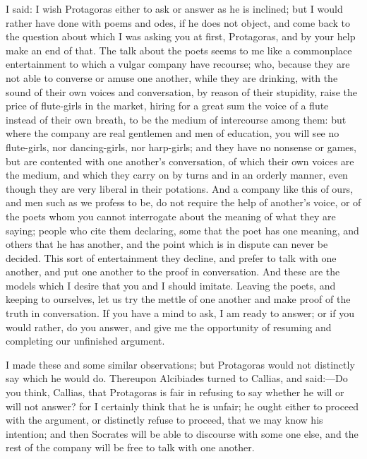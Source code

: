 \documentclass[11pt,letter]{article}
\begin{document}
\par  I said: I wish Protagoras either to ask or answer as he is inclined; but I would rather have done with poems and odes, if he does not object, and come back to the question about which I was asking you at first, Protagoras, and by your help make an end of that. The talk about the poets seems to me like a commonplace entertainment to which a vulgar company have recourse; who, because they are not able to converse or amuse one another, while they are drinking, with the sound of their own voices and conversation, by reason of their stupidity, raise the price of flute-girls in the market, hiring for a great sum the voice of a flute instead of their own breath, to be the medium of intercourse among them: but where the company are real gentlemen and men of education, you will see no flute-girls, nor dancing-girls, nor harp-girls; and they have no nonsense or games, but are contented with one another's conversation, of which their own voices are the medium, and which they carry on by turns and in an orderly manner, even though they are very liberal in their potations. And a company like this of ours, and men such as we profess to be, do not require the help of another's voice, or of the poets whom you cannot interrogate about the meaning of what they are saying; people who cite them declaring, some that the poet has one meaning, and others that he has another, and the point which is in dispute can never be decided. This sort of entertainment they decline, and prefer to talk with one another, and put one another to the proof in conversation. And these are the models which I desire that you and I should imitate. Leaving the poets, and keeping to ourselves, let us try the mettle of one another and make proof of the truth in conversation. If you have a mind to ask, I am ready to answer; or if you would rather, do you answer, and give me the opportunity of resuming and completing our unfinished argument.

\par  I made these and some similar observations; but Protagoras would not distinctly say which he would do. Thereupon Alcibiades turned to Callias, and said:—Do you think, Callias, that Protagoras is fair in refusing to say whether he will or will not answer? for I certainly think that he is unfair; he ought either to proceed with the argument, or distinctly refuse to proceed, that we may know his intention; and then Socrates will be able to discourse with some one else, and the rest of the company will be free to talk with one another.
\end{document}
